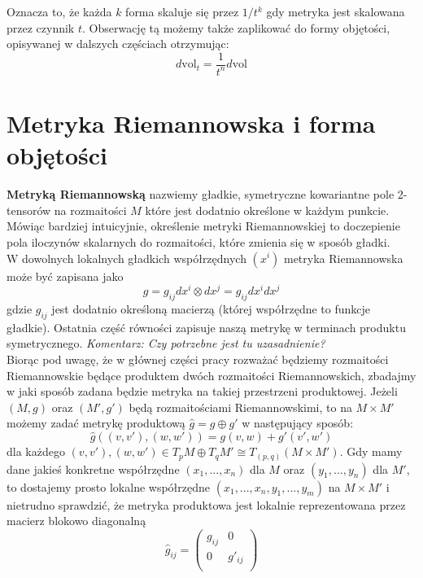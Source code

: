 \documentclass[licencjacka]{pracamgr}
\theoremstyle{definition}
\theoremstyle{definition}
\theoremstyle{plain}
\theoremstyle{plain}
\begin{document}
Oznacza to, że każda $k$ forma skaluje się przez $1/t^k$ gdy metryka
jest skalowana przez czynnik $t$.  Obserwację tą możemy także
zaplikować do formy objętości, opisywanej w dalszych częściach  otrzymując:
\[
d\mathrm{vol}_t = \frac{1}{t^n} d\mathrm{vol}
\]

\section{Metryka Riemannowska i forma objętości}

\textbf{Metryką Riemannowską} nazwiemy gładkie, symetryczne kowariantne
pole 2-tensorów na rozmaitości
$M$ które jest dodatnio określone w każdym punkcie. Mówiąc bardziej
intuicyjnie, określenie metryki Riemannowskiej to doczepienie 
pola iloczynów skalarnych do rozmaitości, które zmienia się w sposób gładki.
\\

W dowolnych lokalnych gładkich współrzędnych $(x^i)$ metryka Riemannowska
może być zapisana jako
\[ %
    g = g_{ij} dx^i \otimes dx^j = g_{ij} dx^i dx^j
\]
gdzie
$g_{ij}$
jest dodatnio określoną macierzą (której współrzędne to funkcje gładkie). Ostatnia
część równości zapisuje naszą metrykę w terminach produktu symetrycznego.
\emph{Komentarz: Czy potrzebne jest tu uzasadnienie?} \\

Biorąc pod uwagę, że w głównej części pracy rozważać będziemy
rozmaitości Riemannowskie będące produktem dwóch rozmaitości
Riemannowskich, zbadajmy w jaki sposób zadana będzie metryka na takiej
przestrzeni produktowej. Jeżeli $(M, g)$ oraz $(M', g')$ będą rozmaitościami
Riemannowskimi, to na $M \times M'$ możemy zadać metrykę produktową
 $\hat g = g \oplus g'$ w następujący sposób:
\[
\hat g
 \left( (v, v'), (w, w') \right) =
 g(v, w) + g'(v', w')
\]
dla każdego
 $(v, v'), (w, w') \in T_p M \oplus T_q M' \cong T_{(p, q)} (M \times M')$.
Gdy mamy dane jakieś konkretne współrzędne $(x_1, ... , x_n)$ dla $M$ oraz
$(y_1, ..., y_n)$ dla $M'$, to dostajemy prosto lokalne współrzędne
$(x_1, ..., x_n, y_1, ..., y_m)$ na $M \times M'$ i nietrudno sprawdzić, 
że metryka produktowa jest lokalnie reprezentowana przez macierz blokowo diagonalną
\[
  \hat g_{ij}  = 
  \left(
    \begin{array}{cc}
     g_{ij}   &  0 \\
      0      & g'_{ij} \\
      \end{array}
  \right)
\] \\
\end{document}

